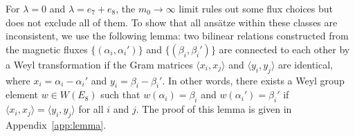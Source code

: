 \documentclass[11pt, a4paper]{article}
\theoremstyle{definition}
\begin{document}
For $ \lambda=0 $ and $ \lambda=e_7+e_8 $, the $ m_0 \to \infty $ limit rules out some flux choices but does not exclude all of them. To show that all ans\"atze within these classes are inconsistent, we use the following lemma: two bilinear relations constructed from the magnetic fluxes $ \{(\alpha_i, \alpha_i')\} $ and $ \{(\beta_i, \beta_i')\} $ are connected to each other by a Weyl transformation if the Gram matrices $ \langle x_i, x_j \rangle $ and $\langle y_i, y_j \rangle $ are identical, where $ x_i=\alpha_i-\alpha_i' $ and $ y_i=\beta_i-\beta_i' $. In other words, there exists a Weyl group element $ w \in W(E_8) $ such that $ w(\alpha_i)=\beta_i $ and $ w(\alpha_i') = \beta_i' $ if $ \langle x_i, x_j \rangle = \langle y_i, y_j \rangle $ for all $ i $ and $ j $. The proof of this lemma is given in Appendix~\ref{app:lemma}.
\end{document}
